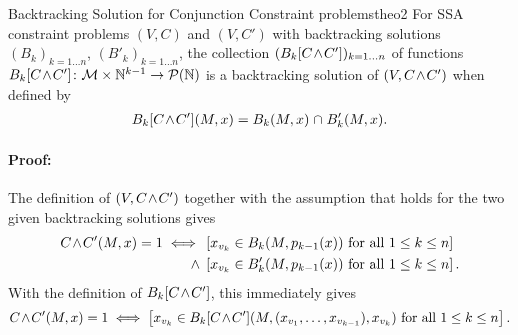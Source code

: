 \begin{theorem}{Backtracking Solution for Conjunction Constraint problems}{theo2}
    For SSA constraint problems $(V,C)$ and $(V,C')$ with backtracking
    solutions $(B_k)_{k=1\dots n}$, $(B'_k)_{k=1\dots n}$, the collection
    $(B_k[C\hspace{-0.5mm}\land\hspace{-0.5mm}C'])_{k=1\dots n}$ of functions
    \mbox{$B_k[C\hspace{-0.5mm}\land\hspace{-0.5mm}C']\colon\mathcal M\times\mathbb N^{k-1}\rightarrow\mathcal P(\mathbb N)$}
    is a backtracking solution of
    $(V,C\hspace{-0.5mm}\land\hspace{-0.5mm}C')$ when defined by
    \begin{align*}
        B_k[C\hspace{-0.5mm}\land\hspace{-0.5mm}C'](M,x)=B_k(M,x)\mathrel\cap B'_k(M,x).
    \end{align*}
    \tcblower
    \paragraph*{Proof:}
    The definition of $(V,C\hspace{-0.5mm}\land\hspace{-0.5mm} C')$ together
    with the assumption that  holds for the two given
    backtracking solutions gives
    \begin{align*}
        C\hspace{-0.5mm}\land\hspace{-0.5mm}C'(M,x)=1\iff{}&\left[x_{v_k}\in B_k(M,p_{k-1}(x))\text{ for all }1\leq k\leq n\right]\\
                                            \mathrel\land{}&\left[x_{v_k}\in B'_k(M,p_{k-1}(x))\text{ for all }1\leq k\leq n\right].
    \end{align*}
    With the definition of $B_k[C\hspace{-0.5mm}\land\hspace{-0.5mm}C']$, this immediately gives
    \begin{align*}
        C\hspace{-0.5mm}\land\hspace{-0.5mm}C'(M,x)=1\iff\left[x_{v_k}\in B_k[C\hspace{-0.5mm}\land\hspace{-0.5mm}C'](M,(x_{v_1},\dots,x_{v_{k-1}}),x_{v_k})\text{ for all }1\leq k\leq n\right].
    \end{align*}
\end{theorem}
